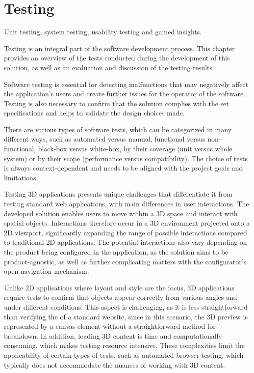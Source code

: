 \chapter{Testing}

\begin{chapterabstract}
    Unit testing, system testing, usability testing and gained insights.
\end{chapterabstract}

Testing is an integral part of the software development process. This chapter provides an overview of the tests conducted during the development of this solution, as well as an evaluation and discussion of the testing results.

Software testing is essential for detecting malfunctions that may negatively affect the application's users and create further issues for the operator of the software. Testing is also necessary to confirm that the solution complies with the set specifications and helps to validate the design choices made.~\cite{Homes2012}

There are various types of software tests, which can be categorized in many different ways, such as automated versus manual, functional versus non-functional, black-box versus white-box, by their coverage (unit versus whole system) or by their scope (performance versus compatibility). The choice of tests is always context-dependent and needs to be aligned with the project goals and limitations.~\cite{Krysik2023}

Testing 3D applications presents unique challenges that differentiate it from testing standard web applications, with main differences in user interactions. The developed solution enables users to move within a 3D space and interact with spatial objects. Interactions therefore occur in a 3D environment projected onto a 2D viewport, significantly expanding the range of possible interactions compared to traditional 2D applications. The potential interactions also vary depending on the product being configured in the application, as the solution aims to be product-agnostic, as well as further complicating matters with the configurator's open navigation mechanism.

Unlike 2D applications where layout and style are the focus, 3D applications require tests to confirm that objects appear correctly from various angles and under different conditions. This aspect is challenging, as it is less straightforward than verifying the  of a standard website, since in this scenario, the 3D preview is represented by a canvas element without a straightforward method for breakdown. In addition, loading 3D content is time and computationally consuming, which makes testing resource intensive. These complexities limit the applicability of certain types of tests, such as automated browser testing, which typically does not accommodate the nuances of working with 3D content.

